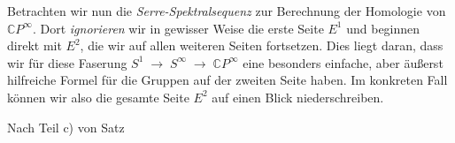 \documentclass[12pt, hidelinks]{article}
\numberwithin{conj}{section}
\begin{document}
                    \smallskip
                    
                    Betrachten wir nun die \emph{Serre-Spektralsequenz} zur Berechnung der Homologie von \(\mathbb{C}P^\infty\). Dort \emph{ignorieren} wir in gewisser Weise die erste Seite \(E^1\) und beginnen direkt mit \(E^2\), die wir auf allen weiteren Seiten fortsetzen. Dies liegt daran, dass wir für diese Faserung \(
                    S^1 \;\longrightarrow\; S^\infty \;\longrightarrow\; \mathbb{C}P^\infty
                    \)
                    eine besonders einfache, aber äußerst hilfreiche Formel für die Gruppen auf der zweiten Seite haben. Im konkreten Fall können wir also die gesamte Seite \(E^2\) auf einen Blick niederschreiben.
                    
                    
                    
                    
                    
                    Nach Teil c) von Satz 
                    \nocite{*}
                    \printbibliography
\end{document}
